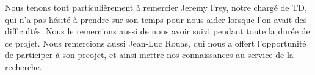 \begin{thanks_perso}
Nous tenons tout particulièrement à remercier Jeremy Frey, notre chargé de TD, qui n'a pas hésité à prendre sur son temps pour nous aider lorsque l'on avait des difficultés. Nous le remercions aussi de nous avoir suivi pendant toute la durée de ce projet.
Nous remercions aussi Jean-Luc Rouas, qui nous a offert l'opportunité de participer à son preojet, et ainsi mettre nos connaissances au service de la recherche.
\end{thanks_perso}